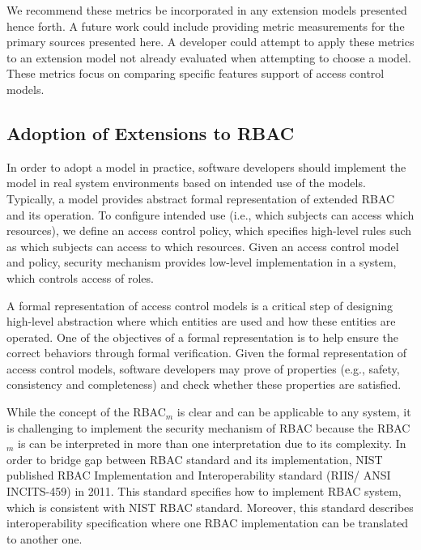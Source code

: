 We recommend these metrics be incorporated in any extension models presented hence forth. A future work could include providing metric measurements for the primary sources presented here. 
A developer could attempt to apply these metrics to an extension model not already evaluated when attempting to choose a model. 
These metrics focus on comparing specific features support of access control models.


\subsection{Adoption of Extensions to RBAC}

In order to adopt a model in practice, software developers should implement the model in real system environments based on intended use of the models. Typically, a model provides abstract formal representation of extended RBAC and its operation. To configure intended use (i.e., which subjects can access which resources), we define an access control policy, which specifies high-level rules such as which subjects can access to which resources. Given an access control model and policy, security mechanism provides low-level implementation in a system, which controls access of roles.

A formal representation of access control models is a critical step of designing high-level abstraction where which entities are used and how these entities are operated.
One of the objectives of a formal representation is to help ensure the correct behaviors through formal verification. Given the formal representation of access control models, software developers may prove of properties (e.g., safety, consistency and completeness) and check whether these properties are satisfied. 

While the concept of the RBAC$_{m}$ is clear and can be applicable to any system, it is challenging to implement the security mechanism of RBAC because the RBAC$_{m}$ is can be interpreted in more than one interpretation due to its complexity. In order to bridge gap between RBAC standard and its implementation, NIST published RBAC Implementation and Interoperability standard (RIIS/ ANSI INCITS-459) in 2011. This standard specifies how to implement RBAC system, which is consistent with NIST RBAC standard. Moreover, this standard describes interoperability specification where one RBAC implementation can be translated to another one.

